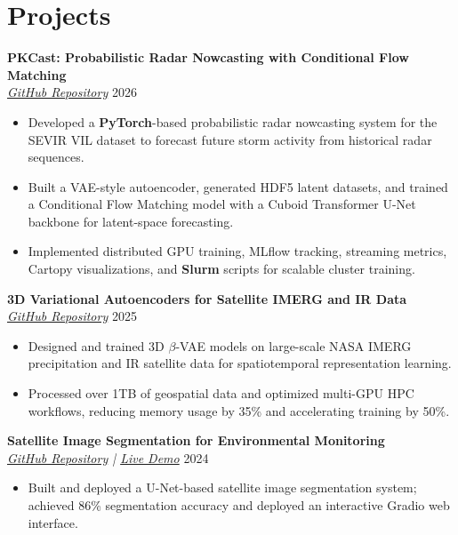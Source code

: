 \documentclass[a4paper,10pt]{article}
\newcommand{\resumeProjectHeading}[3]{
    \textbf{#1}\\
    \textit{#2} \hfill #3
}
\begin{document}
\section*{Projects}

\resumeProjectHeading
{PKCast: Probabilistic Radar Nowcasting with Conditional Flow Matching}
{\href{https://github.com/prerakpatel51/Pkcast.git}{GitHub Repository}}
{2026}
\begin{itemize}
    \item Developed a \textbf{PyTorch}-based probabilistic radar nowcasting system for the SEVIR VIL dataset to forecast future storm activity from historical radar sequences.
    \item Built a VAE-style autoencoder, generated HDF5 latent datasets, and trained a Conditional Flow Matching model with a Cuboid Transformer U-Net backbone for latent-space forecasting.
    \item Implemented distributed GPU training, MLflow tracking, streaming metrics, Cartopy visualizations, and \textbf{Slurm} scripts for scalable cluster training.
\end{itemize}

\resumeProjectHeading
{3D Variational Autoencoders for Satellite IMERG and IR Data}
{\href{https://github.com/prerakpatel51/icp_neuralnetworks_project}{GitHub Repository}}
{2025}
\begin{itemize}
    \item Designed and trained 3D $\beta$-VAE models on large-scale NASA IMERG precipitation and IR satellite data for spatiotemporal representation learning.
    \item Processed over 1TB of geospatial data and optimized multi-GPU HPC workflows, reducing memory usage by 35\% and accelerating training by 50\%.
\end{itemize}

\resumeProjectHeading
{Satellite Image Segmentation for Environmental Monitoring}
{\href{https://github.com/prerakpatel51/satellite-image-segmentor}{GitHub Repository} | \href{https://huggingface.co/spaces/Prerak51/satellite_image_segmentor}{Live Demo}}
{2024}
\begin{itemize}
    \item Built and deployed a U-Net-based satellite image segmentation system; achieved 86\% segmentation accuracy and deployed an interactive Gradio web interface.
\end{itemize}

\end{document}
